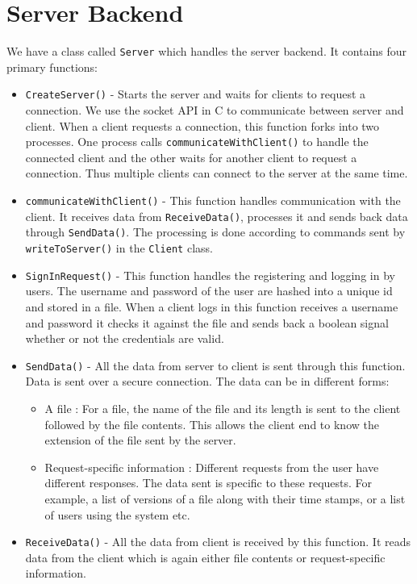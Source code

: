 \documentclass[]{article}
\newcommand{\ty}[1]{\texttt{#1}}
\begin{document}
\section{Server Backend}
We have a class called \ty{Server} which handles the server backend. It contains four primary functions:
\begin{itemize}
\item \ty{CreateServer()} - Starts the server and waits for clients to request a connection. We use the socket API in C to communicate between server and client. When a client requests a connection, this function forks into two processes. One process calls \ty{communicateWithClient()} to handle the connected client and the other waits for another client to request a connection. Thus multiple clients can connect to the server at the same time.
\item \ty{communicateWithClient()} - This function handles communication with the client. It receives data from \ty{ReceiveData()}, processes it and sends back data through \ty{SendData()}. The processing is done according to commands sent by \ty{writeToServer()} in the \ty{Client} class.
\item \ty{SignInRequest()} - This function handles the registering and logging in by users. The username and password of the user are hashed into a unique id and stored in a file. When a client logs in this function receives a username and password it checks it against the file and sends back a boolean signal whether or not the credentials are valid.
\item \ty{SendData()} - All the data from server to client is sent through this function. Data is sent over a secure connection. The data can be in different forms:
\begin{itemize}
\item A file : For a file, the name of the file and its length is sent to the client followed by the file contents. This allows the client end to know the extension of the file sent by the server.
\item Request-specific information : Different requests from the user have different responses. The data sent is specific to these requests. For example, a list of versions of a file along with their time stamps, or a list of users using the system etc.
\end{itemize}
\item \ty{ReceiveData()} - All the data from client is received by this function. It reads data from the client which is again either file contents or request-specific information.
\end{itemize}
\end{document}
